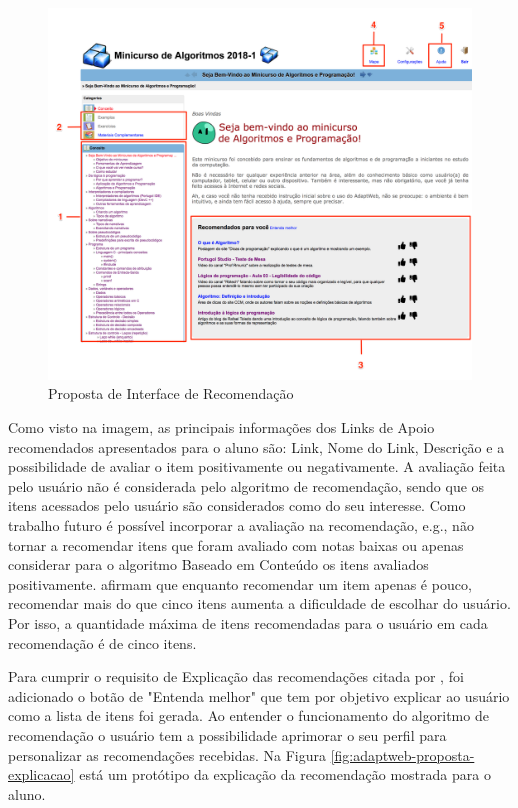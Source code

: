 \begin{figure}[htb]
  \caption{\label{fig:adaptweb-proposta-recomendacao}Proposta de Interface de Recomendação}
  \begin{center}
      \includegraphics[scale=0.4]{./Figuras/interface-recomendacao.png}
  \end{center}
\end{figure}

Como visto na imagem, as principais informações dos Links de Apoio recomendados apresentados para o aluno são: Link, Nome do Link, Descrição e a possibilidade de avaliar o item
positivamente ou negativamente. A avaliação feita pelo usuário não é considerada pelo algoritmo de recomendação, sendo que os itens acessados pelo
usuário são considerados como do seu interesse. Como trabalho futuro é possível incorporar a avaliação na recomendação, e.g.,
não tornar a recomendar itens que foram avaliado com notas baixas ou apenas considerar para o algoritmo Baseado em Conteúdo
os itens avaliados positivamente.  afirmam que enquanto recomendar um item apenas é pouco, recomendar mais do que cinco itens
aumenta a dificuldade de escolhar do usuário. Por isso, a quantidade máxima de itens recomendadas para o usuário em cada
recomendação é de cinco itens.

Para cumprir o requisito de Explicação das recomendações citada por , foi adicionado o
botão de "Entenda melhor" que tem por objetivo explicar ao usuário como a lista de itens foi gerada. Ao entender o
funcionamento do algoritmo de recomendação o usuário tem a possibilidade aprimorar o seu perfil para personalizar as
recomendações recebidas. Na Figura \ref{fig:adaptweb-proposta-explicacao} está um protótipo da explicação da recomendação
mostrada para o aluno.

